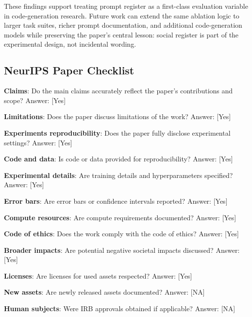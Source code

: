 \documentclass{article}
\begin{document}
These findings support treating prompt register as a first-class evaluation variable in code-generation research. Future work can extend the same ablation logic to larger task suites, richer prompt documentation, and additional code-generation models while preserving the paper's central lesson: social register is part of the experimental design, not incidental wording.

\subsection{NeurIPS Paper Checklist}

\label{sec:neurips_paper_checklist}

\textbf{Claims}: Do the main claims accurately reflect the paper's contributions and scope?
Answer: [Yes]

\textbf{Limitations}: Does the paper discuss limitations of the work?
Answer: [Yes]

\textbf{Experiments reproducibility}: Does the paper fully disclose experimental settings?
Answer: [Yes]

\textbf{Code and data}: Is code or data provided for reproducibility?
Answer: [Yes]

\textbf{Experimental details}: Are training details and hyperparameters specified?
Answer: [Yes]

\textbf{Error bars}: Are error bars or confidence intervals reported?
Answer: [Yes]

\textbf{Compute resources}: Are compute requirements documented?
Answer: [Yes]

\textbf{Code of ethics}: Does the work comply with the code of ethics?
Answer: [Yes]

\textbf{Broader impacts}: Are potential negative societal impacts discussed?
Answer: [Yes]

\textbf{Licenses}: Are licenses for used assets respected?
Answer: [Yes]

\textbf{New assets}: Are newly released assets documented?
Answer: [NA]

\textbf{Human subjects}: Were IRB approvals obtained if applicable?
Answer: [NA]



\end{document}
